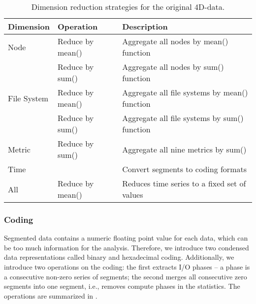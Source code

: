 \documentclass{jhps}
\begin{document}
\begin{table}
	\centering
	\begin{tabularx}{\textwidth}{llX}
		Dimension       & Operation                                    &  Description                                                       \\
		\hline
		Node            & Reduce by mean()                             &  Aggregate all nodes by mean() function                            \\
		                & Reduce by sum()                              &  Aggregate all nodes by sum() function                             \\
		\hline
		File System     & Reduce by mean()                             &  Aggregate all file systems by mean() function                     \\
		                &
		Reduce by sum() & Aggregate all file systems by sum() function \\
		\hline
		Metric          & Reduce by sum()                              &  Aggregate all nine metrics by sum()                               \\
		\hline
		Time            &                                              &  Convert segments to coding formats \\
		\hline
    All     & Reduce by mean()    &  Reduces time series to a fixed set of values                      \\
		\hline
	\end{tabularx}
	\caption{Dimension reduction strategies for the original 4D-data.}
	\label{tab:reduction_techniques}
\end{table}

\subsubsection{Coding}

Segmented data contains a numeric floating point value for each data, which can be too much information for the analysis.
Therefore, we introduce two condensed data representations called binary and hexadecimal coding.
Additionally, we introduce two operations on the coding:
the first extracts I/O phases -- a phase is a consecutive non-zero series of segments;
the second merges all consecutive zero segments into one segment, i.e., removes compute phases in the statistics.
The operations are summarized in .
\end{document}
